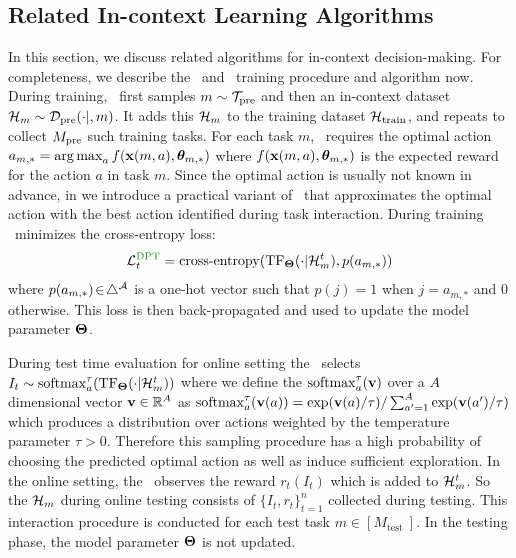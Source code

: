 \subsection{Related In-context Learning Algorithms}
\label{sec:prelim-dpt}
\vspace*{-0.5em}
In this section, we discuss related algorithms for in-context decision-making.
%
For completeness, we describe the \dpt\ and \ad\ training procedure and algorithm now.
%
%
During training, \dpt\ first samples $m\sim\mathcal{T}_{\text{pre}}$ and then an in-context dataset $\mathcal{H}_m\sim \mathcal{D}_{\text{pre}}(\cdot|,m)$. It adds this $\mathcal{H}_m$ to the training dataset $\mathcal{H}_{\text{train}}$, and repeats to collect $M_{\text{pre}}$ such training tasks. 
%
For each task $m$, \dpt\  requires the optimal action $a_{m,*} = \mathop{\rm arg\,max}_a f(\mathbf{x}(m, a),  \boldsymbol{\theta}_{m, *})$ where $ f(\mathbf{x}(m, a),  \boldsymbol{\theta}_{m, *})$ is the expected reward for the action $a$ in task $m$. 
%
Since the optimal action is usually not known in advance, in  we introduce a practical variant of \dpt\  that approximates the optimal action with the best action identified during task interaction.
%
During training \dpt\ minimizes the cross-entropy loss:
\begin{align}
    \L^{\mathrm{\dpt}}_t = \operatorname{cross-entropy}(\T_{\bTheta}(\cdot|\H_m^t), p({a}_{m,*})) \label{eq:loss-dptg}
\end{align}
where $p({a}_{m,*})\!\in \!\triangle^{\mathcal{A}}$ is a one-hot vector such that $p(j) \!=\! 1$ when $j\!=\!{a}_{m,*}$ and $0$ otherwise. This loss is then back-propagated and used to update the model parameter $\mathbf{\Theta}$. 



During test time evaluation for online setting the \dpt\ selects $I_t \sim \mathrm{softmax}^\tau_a(\mathrm{TF}_{\mathbf{\Theta}}(\cdot|\mathcal{H}^t_m))$ where we define the $\mathrm{softmax}^\tau_a(\mathbf{v})$ over a $A$ dimensional vector $\mathbf{v}\in \mathbb{R}^A$ as $ \mathrm{softmax}^\tau_a(\mathbf{v}(a)) = \exp(\mathbf{v}(a)/\tau)/\sum_{a'=1}^A \exp(\mathbf{v}(a')/\tau)$ which produces a distribution over actions weighted by the temperature parameter $\tau > 0$. Therefore this sampling procedure has a high probability of choosing the predicted optimal action as well as induce sufficient exploration. 
%
%
In the online setting, the \dpt\ observes the reward $r_t(I_t)$ which is added to $\mathcal{H}^t_m$. So the $\mathcal{H}_m$ during online testing consists of $\{I_t, r_t\}_{t=1}^n$ collected during testing. This interaction procedure is conducted for each test task $m\in [M_{\text {test }}]$.
%
In the testing phase, the model parameter $\mathbf{\Theta}$ is not updated. 

